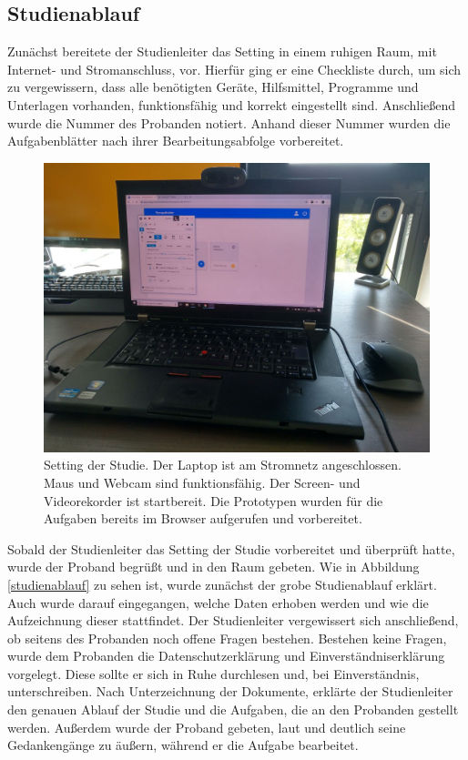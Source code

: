 \subsection{Studienablauf}
Zunächst bereitete der Studienleiter das Setting in einem ruhigen Raum, mit Internet- und Stromanschluss, vor. Hierfür ging er eine Checkliste durch, um sich zu vergewissern, dass alle benötigten Geräte, Hilfsmittel, Programme und Unterlagen vorhanden, funktionsfähig und korrekt eingestellt sind. Anschließend wurde die Nummer des Probanden notiert. Anhand dieser Nummer wurden die Aufgabenblätter nach ihrer Bearbeitungsabfolge vorbereitet.

\begin{figure}[h]
\centering
\includegraphics[width=1\textwidth]{pictures/setting}
\caption{Setting der Studie. Der Laptop ist am Stromnetz angeschlossen. Maus und Webcam sind funktionsfähig. Der Screen- und Videorekorder ist startbereit. Die Prototypen wurden für die Aufgaben bereits im Browser aufgerufen und vorbereitet.}
\label{counterbalancing}
\end{figure}

Sobald der Studienleiter das Setting der Studie vorbereitet und überprüft hatte, wurde der Proband begrüßt und in den Raum gebeten. Wie in Abbildung \ref{studienablauf} zu sehen ist, wurde zunächst der grobe Studienablauf erklärt. Auch wurde darauf eingegangen, welche Daten erhoben werden und wie die Aufzeichnung dieser stattfindet. Der Studienleiter vergewissert sich anschließend, ob seitens des Probanden noch offene Fragen bestehen. Bestehen keine Fragen, wurde dem Probanden die Datenschutzerklärung und Einverständniserklärung vorgelegt. Diese sollte er sich in Ruhe durchlesen und, bei Einverständnis, unterschreiben. Nach Unterzeichnung der Dokumente, erklärte der Studienleiter den genauen Ablauf der Studie und die Aufgaben, die an den Probanden gestellt werden. Außerdem wurde der Proband gebeten, laut und deutlich seine Gedankengänge zu äußern, während er die Aufgabe bearbeitet.

